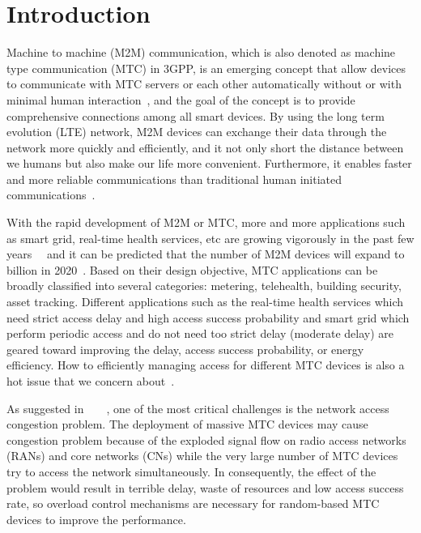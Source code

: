 \section{Introduction}
\label{intro}
	Machine to machine (M2M) communication, which is also denoted as machine type communication (MTC) in 3GPP, is an emerging concept that allow devices to communicate with MTC servers or each other automatically without or with minimal human interaction~\cite{3GPP22.368}, and the goal of the concept is to provide comprehensive connections among all smart devices. By using the long term evolution (LTE) network, M2M devices can exchange their data through the network more quickly and efficiently, and it not only short the distance between we humans but also make our life more convenient. Furthermore, it enables faster and more reliable communications than traditional human initiated communications~\cite{lien2011toward}.

	
    With the rapid development of M2M or MTC, more and more applications such as smart grid, real-time health services, etc are growing vigorously in the past few years~\cite{3GPP22.868}~\cite{3GPP23.888} and it can be predicted that the number of M2M devices will expand to billion in 2020~\cite{ABI}. Based on their design objective, MTC applications can be broadly classified into several categories: metering, telehealth, building security, asset tracking. Different applications such as the real-time health services which need strict access delay and high access success probability and smart grid which perform periodic access and do not need too strict delay (moderate delay) are geared toward improving the delay, access success probability, or energy efficiency. How to efficiently managing access for different MTC devices is also a hot issue that we concern about~\cite{rajandekar2015survey}.
    

    As suggested in~\cite{3GPP37.868}~\cite{hasan2013random}~\cite{cao2013cellular}~\cite{gotsis2012m2m}, one of the most critical challenges is the network access congestion problem. The deployment of massive MTC devices may cause congestion problem because of the exploded signal flow on radio access networks (RANs) and core networks (CNs) while the very large number of MTC devices try to access the network simultaneously. In consequently, the effect of the problem would result in terrible delay, waste of resources and low access success rate, so overload control mechanisms are necessary for random-based MTC devices to improve the performance.
	

